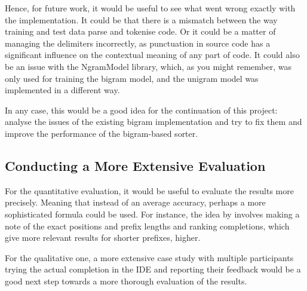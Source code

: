 Hence, for future work, it would be useful to see what went wrong exactly with the implementation. It could be that there is a mismatch between the way training and test data parse and tokenise code. Or it could be a matter of managing the delimiters incorrectly, as punctuation in source code has a significant influence on the contextual meaning of any part of code. It could also be an issue with the NgramModel library, which, as you might remember, was only used for training the bigram model, and the unigram model was implemented in a different way.

In any case, this would be a good idea for the continuation of this project: analyse the issues of the existing bigram implementation and try to fix them and improve the performance of the bigram-based sorter. 
\subsection{Conducting a More Extensive Evaluation}
For the quantitative evaluation, it would be useful to evaluate the results more precisely. Meaning that instead of an average accuracy, perhaps a more sophisticated formula could be used. For instance, the idea by \cite{Robb08a} involves making a note of the exact positions and prefix lengths and ranking completions, which give more relevant results for shorter prefixes, higher.

For the qualitative one, a more extensive case study with multiple participants trying the actual completion in the IDE and reporting their feedback would be a good next step towards a more thorough evaluation of the results.